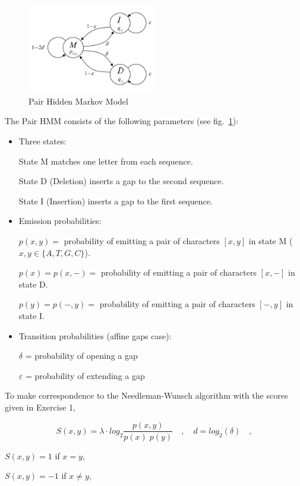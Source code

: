 \documentclass[a4paper,11pt]{article}
\begin{document}
\begin{figure}[h]
\begin{center}
\includegraphics[width=0.5\textwidth]{HMM.jpg}
\caption{Pair Hidden Markov Model}
\label{fig:HMM}
\end{center}
\end{figure}


The Pair HMM consists of the following parameters (see fig.~\ref{fig:HMM}):

\begin{itemize}
\item Three states:

State M matches one letter from each sequence.

State D (Deletion) inserts a gap to the second sequence.

State I (Insertion) inserts a gap to the first sequence.

\item Emission probabilities:

$p(x,y) =$ probability of emitting a pair of characters $[x,y]$ in state M ($x,y \in \{A,T,G,C\}$).

$p(x) = p(x,-) =$ probability of emitting a pair of characters $[x,-]$ in state D.

$p(y) = p(-,y) =$ probability of emitting a pair of characters $[-,y]$ in state I.

\item Transition probabilities (affine gaps case):

$\delta$ = probability of opening a gap

$\varepsilon$ = probability of extending a gap
\end{itemize}

To make correspondence to the Needleman-Wunsch algorithm with the scores given in Exercise 1,


$$S(x,y)=\lambda \cdot log_2\frac{p(x,y)}{p(x)\; p(y)} \quad , \quad d=log_2(\delta) \quad ,$$

$S(x,y) = 1$ if $x=y$, 

$S(x,y) = -1$ if $x\neq y$,
\end{document}
